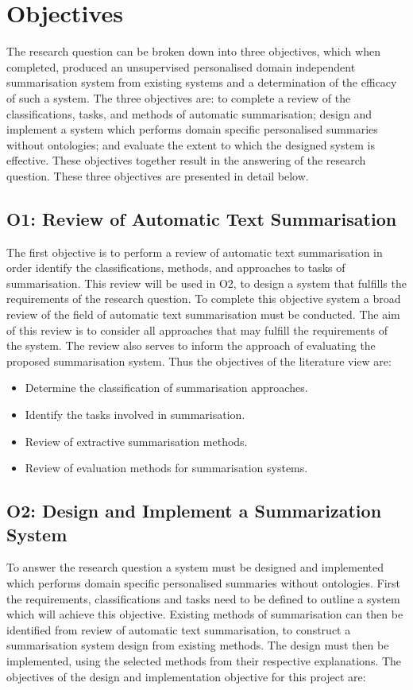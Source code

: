 \section{Objectives}

The research question can be broken down into three objectives, which when completed, produced an unsupervised personalised domain independent summarisation system from existing systems and a determination of the efficacy of such a system. The three objectives are: to complete a review of the classifications, tasks, and methods of automatic summarisation; design and implement a system which performs domain specific personalised summaries without ontologies; and evaluate the extent to which the designed system is effective. These objectives together result in the answering of the research question. These three objectives are presented in detail below.

\subsection*{O1: Review of Automatic Text Summarisation}

The first objective is to perform a review of automatic text summarisation in order identify the classifications, methods, and approaches to tasks of summarisation. This review will be used in O2, to design a system that fulfills the requirements of the research question. To complete this objective system a broad review of the field of automatic text summarisation must be conducted. The aim of this review is to consider all approaches that may fulfill the requirements of the system. The review also serves to inform the approach of evaluating the proposed summarisation system. Thus the objectives of the literature view are:

\begin{itemize}
    \item Determine the classification of summarisation approaches.
    \item Identify the tasks involved in summarisation.
    \item Review of extractive summarisation methods.
    \item Review of evaluation methods for summarisation systems.
\end{itemize}

\subsection*{O2: Design and Implement a Summarization System}
To answer the research question a system must be designed and implemented which performs domain specific personalised summaries without ontologies. First the requirements, classifications and tasks need to be defined to outline a system which will achieve this objective. Existing methods of summarisation can then be identified from review of automatic text summarisation, to construct a summarisation system design from existing methods. The design must then be implemented, using the selected methods from their respective explanations. The objectives of the design and implementation objective for this project are:

